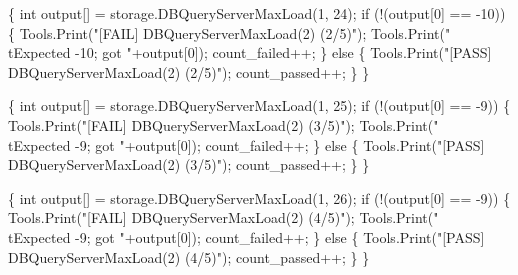 \documentclass{article}
\def\nwendcode{\endtrivlist \endgroup}
\let\nwdocspar=\par
\begin{document}
\{
  int output[] = storage.DBQueryServerMaxLoad(1, 24);
  if (!(output[0] == -10)) \{
    Tools.Print("[FAIL] DBQueryServerMaxLoad(2) (2/5)");
    Tools.Print("\\tExpected -10; got "+output[0]);
    count_failed++;
  \} else \{
    Tools.Print("[PASS] DBQueryServerMaxLoad(2) (2/5)");
    count_passed++;
  \}
\}
\nwendcode{}\nwdocspar
\nwenddocs{}\endmoddef{}
\{
  int output[] = storage.DBQueryServerMaxLoad(1, 25);
  if (!(output[0] == -9)) \{
    Tools.Print("[FAIL] DBQueryServerMaxLoad(2) (3/5)");
    Tools.Print("\\tExpected -9; got "+output[0]);
    count_failed++;
  \} else \{
    Tools.Print("[PASS] DBQueryServerMaxLoad(2) (3/5)");
    count_passed++;
  \}
\}
\nwendcode{}\nwdocspar
\nwenddocs{}\endmoddef{}
\{
  int output[] = storage.DBQueryServerMaxLoad(1, 26);
  if (!(output[0] == -9)) \{
    Tools.Print("[FAIL] DBQueryServerMaxLoad(2) (4/5)");
    Tools.Print("\\tExpected -9; got "+output[0]);
    count_failed++;
  \} else \{
    Tools.Print("[PASS] DBQueryServerMaxLoad(2) (4/5)");
    count_passed++;
  \}
\}
\nwendcode{}\nwdocspar
\end{document}
